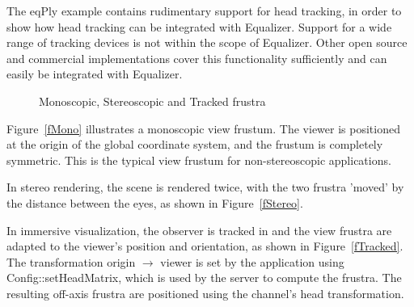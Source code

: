 \documentclass[10pt,a4]{scrartcl}
\newcommand{\fig}[1]{Figure~\ref{#1}}
\begin{document}
The \textsf{eqPly} example contains rudimentary support for head
tracking, in order to show how head tracking can be integrated with
Equalizer. Support for a wide range of tracking devices is not within the
scope of Equalizer. Other open source and commercial implementations
cover this functionality sufficiently and can easily be integrated with
Equalizer.

\begin{figure}[h!t]
  \hfil
  \hfil
  {\caption{\small\label{fImmersive}Monoscopic, Stereoscopic and Tracked
    frustra}}
\end{figure}

\fig{fMono} illustrates a monoscopic view frustum. The viewer is
positioned at the origin of the global coordinate system, and the
frustum is completely symmetric. This is the typical view frustum for
non-stereoscopic applications.

In stereo rendering, the scene is rendered twice, with the two frustra
'moved' by the distance between the eyes, as shown in \fig{fStereo}.

In immersive visualization, the observer is tracked in and the view
frustra are adapted to the viewer's position and orientation, as shown
in \fig{fTracked}. The transformation origin $\rightarrow$ viewer is set by
the application using \textsf{Config::setHeadMatrix}, which is used by
the server to compute the frustra. The resulting off-axis frustra are
positioned using the channel's head transformation.

{\footnotesize\begin{lstlisting}
\end{lstlisting}}
\fi
\end{document}
